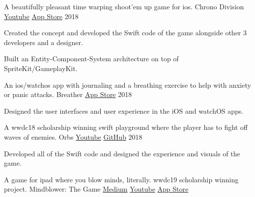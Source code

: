 

\begin{cventries}
  \cventry
    {A beautifully pleasant time warping shoot'em up game for ios.}
    {Chrono Division}
    {\href{https://www.youtube.com/watch?v=Wc9-ALdmvRw}{Youtube} \hspace{4pt} \href{https://itunes.apple.com/app/id1437675179}{App Store}}
    {2018}
    {
      \begin{cvitems}
        \item {Created the concept and developed the Swift code of the game alongside other 3 developers and a designer.}
        \item {Built an Entity-Component-System architecture on top of SpriteKit/GameplayKit.}
      \end{cvitems}
    }
  \cventry
    {An ios/watchos app with journaling and a breathing exercise to help with anxiety or panic attacks.}
    {Breather}
    {\href{https://itunes.apple.com/app/id1370659046}{App Store}}
    {2018}
    {
      \begin{cvitems}
        \item {Designed the user interfaces and user experience in the iOS and watchOS apps.}
      \end{cvitems}
    }
  \cventry
    {A wwdc18 scholarship winning swift playground where the player has to fight off waves of enemies.}
    {Orbs}
    {\href{https://www.youtube.com/watch?v=W-tzS0x1SiA}{Youtube} \hspace{4pt} \href{https://github.com/renanmagagnin/orbs-wwdc18}{GitHub}}
    {2018}
    {
      \begin{cvitems}
        \item {Developed all of the Swift code and designed the experience and visuals of the game.}
      \end{cvitems}
    }
  \cventry
    {A game for ipad where you blow minds, literally. wwdc19 scholarship winning project.}
    {Mindblower: The Game}
    {\href{https://medium.freecodecamp.org/how-i-won-a-scholarship-to-apples-yearly-event-for-the-second-time-f04f5f4636b1}{Medium} \hspace{4pt} \href{https://www.youtube.com/watch?v=xH9cn7BtG8k}{Youtube} \hspace{4pt} \href{https://itunes.apple.com/us/app/mindblower-the-game/id1460079689}{App Store}} %

\end{cventries}
